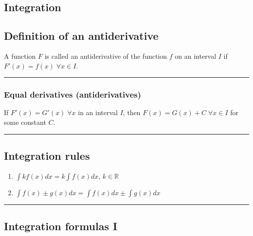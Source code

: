 \documentclass[
  landscape,  
  10pt,
]{article}
\begin{document}
\begin{multicols}{3}
\hypertarget{integration}{%
\section{Integration}\label{integration}}

\hypertarget{definition-of-an-antiderivative}{%
\subsection{Definition of an
antiderivative}\label{definition-of-an-antiderivative}}

A function \(F\) is called an antiderivative of the function \(f\) on an
interval \(I\) if \(F'(x) = f(x) \;\forall x \in I\).

\begin{center}\rule{0.5\linewidth}{0.5pt}\end{center}

\hypertarget{equal-derivatives-antiderivatives}{%
\subsubsection{Equal derivatives
(antiderivatives)}\label{equal-derivatives-antiderivatives}}

If \(F'(x)=G'(x) \;\forall x\) in an interval \(I\), then
\(F(x) = G(x) + C \;\forall x \in I\) for some constant \(C\).

\begin{center}\rule{0.5\linewidth}{0.5pt}\end{center}

\hypertarget{integration-rules}{%
\subsection{Integration rules}\label{integration-rules}}

\begin{enumerate}
\def\labelenumi{\arabic{enumi}.}
\item
  \(\displaystyle\int kf(x)dx = k \int f(x)dx\), \(k \in \mathbb{R}\)
\item
  \(\displaystyle\int f(x) \pm g(x) dx = \int f(x)dx \pm \int g(x)dx\)
\end{enumerate}

\begin{center}\rule{0.5\linewidth}{0.5pt}\end{center}

\hypertarget{integration-formulas-i}{%
\subsection{Integration formulas I}\label{integration-formulas-i}}


\end{multicols}
\end{document}
